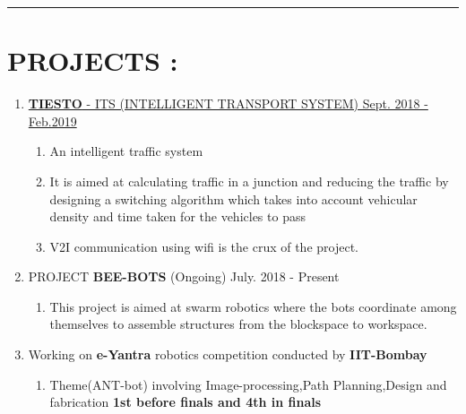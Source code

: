 \documentclass[10pts]{report}
\begin{document}
\begin{flushleft}
\vspace{1pt}
\hrule
\section*{PROJECTS :}


                \begin{enumerate}
                        \item {\href{ https://drive.google.com/open?id=1pd96-OSmin-dtKh7DJlY9sDHOyO3hJJS} {\textbf{TIESTO} - ITS (INTELLIGENT TRANSPORT SYSTEM)  Sept. 2018 - Feb.2019}}
                                                                   \begin{enumerate}
                                                                                 \item  An intelligent traffic system 
                                                                                 \item It is aimed at calculating traffic in a junction and reducing the traffic by designing a switching algorithm which takes into account vehicular density and time taken for the vehicles to pass 
                                                                                 \item V2I communication using wifi is the crux of the project.
                                                                                
                                                                   \end{enumerate}



                       \item{PROJECT {\textbf{BEE-BOTS} (Ongoing)}{ July. 2018 - Present}}{}{}
                                                                    \begin{enumerate}
                                                                                  \item This project is aimed at swarm robotics where the bots coordinate among themselves to assemble structures from the blockspace to workspace.
                                                                    \end{enumerate}




                    \item Working on \textbf{e-Yantra} robotics competition conducted by \textbf{IIT-Bombay}
                                                                   \begin{enumerate}
                                                                           \item Theme(ANT-bot) involving Image-processing,Path Planning,Design and fabrication \textbf{1st before              finals and 4th in finals} 
                                                                   \end{enumerate}


                      \end{enumerate}
\end{flushleft}
\end{document}
